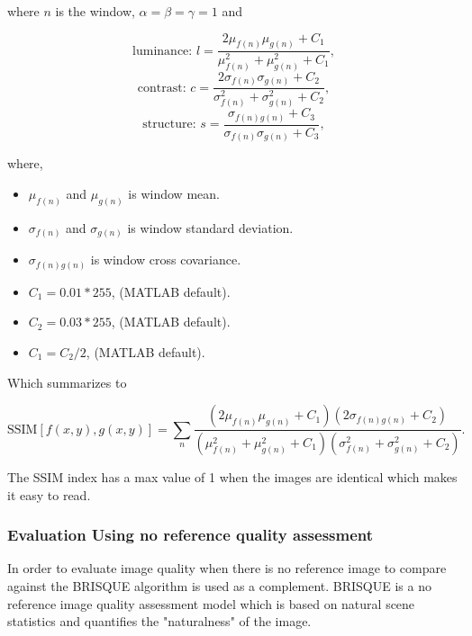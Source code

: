 where $n$ is the window, $\alpha=\beta=\gamma = 1$ and 

\begin{equation}
\displaystyle \text{luminance: } l = \frac{2\mu_{f(n)}\mu_{g(n)} + C_1}{\mu_{f(n)}^2 + \mu_{g(n)}^2 + C_1},
\end{equation}
\begin{equation}
\text{contrast: } c = \frac{2\sigma_{f(n)}\sigma_{g(n)} + C_2}{\sigma_{f(n)}^2 + \sigma_{g(n)}^2 + C_2},
\end{equation}
\begin{equation}
\text{structure: } s = \frac{\sigma_{f(n)g(n)} + C_3}{\sigma_{f(n)} \sigma_{g(n)} + C_3},
\end{equation}

where,

\begin{itemize}
\item $\mu_{f(n)}$ and $\mu_{g(n)}$ is window mean.
\item $\sigma_{f(n)}$ and $\sigma_{g(n)}$ is window standard deviation.
\item $\sigma_{f(n)g(n)}$ is window cross covariance.
\item $C_1 = 0.01*255$, (MATLAB default).
\item $C_2 = 0.03*255$, (MATLAB default).
\item $C_1 = C_2/2$, (MATLAB default).
\end{itemize} 

Which summarizes to

\begin{equation}
\text{SSIM}[f(x,y),g(x,y)] = \sum_n \frac{(2\mu_{f(n)}\mu_{g(n)} + C_1)(2\sigma_{f(n)g(n)} + C_2)}{(\mu_{f(n)}^2 + \mu_{g(n)}^2 + C_1)(\sigma_{f(n)}^2 + \sigma_{g(n)}^2 + C_2)}.
\end{equation} 

The SSIM index has a max value of 1 when the images are identical which makes it easy to read. \cite{book:image_processing}

\subsubsection{Evaluation Using no reference quality assessment}
In order to evaluate image quality when there is no reference image to compare against the BRISQUE algorithm is used as a complement. BRISQUE is a no reference image quality assessment model which is based on natural scene statistics and quantifies the "naturalness" of the image.    \cite{article:brisque}

